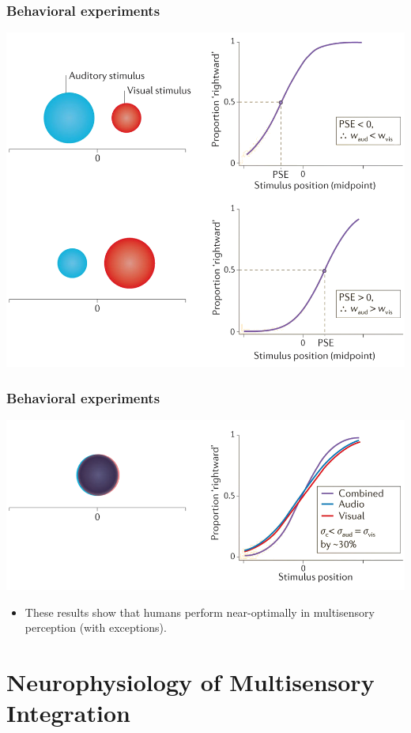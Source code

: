 \documentclass{beamer}
\begin{document}
\begin{frame}
  \frametitle{Behavioral experiments \cite{fetsch_bridging_2013}}
  \begin{center}
    \includegraphics[width=.9\textwidth]{visaudloc1}
  \end{center}
\end{frame}

\begin{frame}
  \frametitle{Behavioral experiments \cite{fetsch_bridging_2013}}
  \begin{center}
    \includegraphics[width=.9\textwidth]{visaudloc2}
  \end{center}
  \begin{itemize}
    \item These results show that humans perform near-optimally in multisensory perception (with exceptions).
  \end{itemize}
\end{frame}

\section{Neurophysiology of Multisensory Integration}
\end{document}
